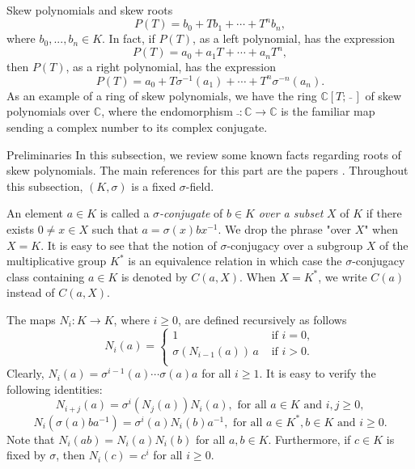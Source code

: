 \documentclass[11pt,a4paper]{article}
\theoremstyle{theorem}
\numberwithin{equation}{section}
\newcommand{\s}{\sigma}
\begin{document}
\begin{section}{Skew polynomials and skew roots}
	$$P(T)=b_0+T b_1+\cdots+T^n b_n,$$
	where  $b_0,...,b_n\in K$. In fact, if $P(T)$, as a left polynomial, has the expression 
	 $$P(T)=a_0+a_1T+\cdots+a_n T^n,$$ then $P(T)$, as a right polynomial, has the expression
	 $$P(T)=a_0+T\s^{-1}(a_1)+\cdots+ T^n\s^{-n}(a_n).$$
	 As an example of a ring of skew polynomials, we have the ring $\mathbb{C}[T;\, \bar \,\,]$ of skew polynomials over $\mathbb{C}$, where the endomorphism $\bar\,:\mathbb{C}\to \mathbb{C}$ is the familiar map sending a complex number to its complex conjugate.
\begin{subsection}{Preliminaries}\label{(S)preliminaries}
	In this subsection, we review some known facts regarding roots of skew polynomials. The main references for this part are the papers  \cite{lam1985general, LamLeroy1988}. Throughout this subsection, $(K,\s)$ is a fixed $\s$-field. 
	
	An element $a\in K$ is called a \textit{$\s$-conjugate} of $b\in K$ \textit{over a subset} $X$ of $K$ if there exists $0\neq x\in X$ such that $a=\sigma(x)bx^{-1}$.  We drop the phrase "over $X$" when $X=K$. It is easy to see that the notion of $\s$-conjugacy over a subgroup $X$ of the multiplicative group $K^*$ is an equivalence relation in which case the $\s$-conjugacy class containing $a\in K$ is denoted by $C(a,X)$. When $X=K^*$, we write $C(a)$ instead of $C(a,X)$. 		
		
	The maps $N_i:K\to K$, where $i\geq 0$, are defined recursively as follows
	$$N_{i}(a)=\begin{cases}
		1& \text{ if }i=0,\\
		\sigma(N_{i-1}(a))\,a & \text{ if } i>0.\\
	\end{cases}
	$$
	Clearly, $N_i(a)=\s^{i-1}(a)\cdots \s(a)a$ for all $i\geq 1$. It is easy to verify the following identities:
	\begin{equation}\label{(Id)Ni+j}
		N_{i+j}(a)=\sigma^i(N_j(a))N_i(a), \text{ for all } a\in K \text{ and } i,j\geq 0,
	\end{equation}
	\begin{equation}\label{(Id)Niofconjugate}
		N_i(\sigma(a)ba^{-1})=\sigma^i(a)N_i(b)a^{-1}, \text{ for all } a\in K^*, b\in K \text{ and } i\geq 0.
	\end{equation}
	Note that $N_i(ab)=N_i(a)N_i(b)$ for all $a,b\in K$. Furthermore, if $c\in K$ is fixed by $\s$, then $N_i(c)=c^i$ for all $i\geq 0$.
 

\end{subsection}
\end{section}
\end{document}
